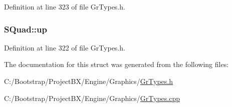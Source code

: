 Definition at line 323 of file GrTypes.h.\hypertarget{struct_s_quad_dbfd9edef4a3e4465da3b6ba1debd473}{
\subsubsection[{up}]{ {\bf SQuad::up}}}
\label{struct_s_quad_dbfd9edef4a3e4465da3b6ba1debd473}




Definition at line 322 of file GrTypes.h.

The documentation for this struct was generated from the following files:\begin{CompactItemize}
\item 
C:/Bootstrap/ProjectBX/Engine/Graphics/\hyperlink{_gr_types_8h}{GrTypes.h}\item 
C:/Bootstrap/ProjectBX/Engine/Graphics/\hyperlink{_gr_types_8cpp}{GrTypes.cpp}\end{CompactItemize}
